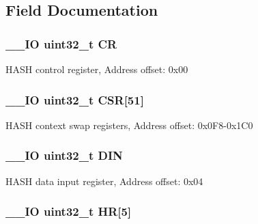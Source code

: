 \subsection{Field Documentation}
\hypertarget{struct_h_a_s_h___type_def_ab40c89c59391aaa9d9a8ec011dd0907a}{
\subsubsection[{C\-R}]{\setlength{\rightskip}{0pt plus 5cm}\-\_\-\-\_\-\-I\-O uint32\-\_\-t C\-R}}\label{struct_h_a_s_h___type_def_ab40c89c59391aaa9d9a8ec011dd0907a}
H\-A\-S\-H control register, Address offset\-: 0x00 \hypertarget{struct_h_a_s_h___type_def_a5a72a62805d5497f2b44448edd18f20f}{
\subsubsection[{C\-S\-R}]{\setlength{\rightskip}{0pt plus 5cm}\-\_\-\-\_\-\-I\-O uint32\-\_\-t C\-S\-R\mbox{[}51\mbox{]}}}\label{struct_h_a_s_h___type_def_a5a72a62805d5497f2b44448edd18f20f}
H\-A\-S\-H context swap registers, Address offset\-: 0x0\-F8-\/0x1\-C0 \hypertarget{struct_h_a_s_h___type_def_a445dd5529e7dc6a4fa2fec4f78da2692}{
\subsubsection[{D\-I\-N}]{\setlength{\rightskip}{0pt plus 5cm}\-\_\-\-\_\-\-I\-O uint32\-\_\-t D\-I\-N}}\label{struct_h_a_s_h___type_def_a445dd5529e7dc6a4fa2fec4f78da2692}
H\-A\-S\-H data input register, Address offset\-: 0x04 \hypertarget{struct_h_a_s_h___type_def_a02cdb629fbb2bfa63db818ac846847a1}{
\subsubsection[{H\-R}]{\setlength{\rightskip}{0pt plus 5cm}\-\_\-\-\_\-\-I\-O uint32\-\_\-t H\-R\mbox{[}5\mbox{]}}}\label{struct_h_a_s_h___type_def_a02cdb629fbb2bfa63db818ac846847a1}
